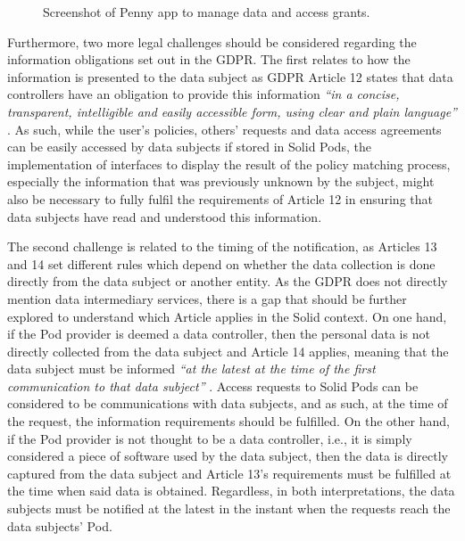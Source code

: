 \begin{figure}[htp]
    \centering
    \caption{Screenshot of Penny app to manage data and access grants.}
    \label{fig:penny}
\end{figure}

Furthermore, two more legal challenges should be considered regarding the information obligations set out in the GDPR.
The first relates to how the information is presented to the data subject as GDPR Article 12 states that data controllers have an obligation to provide this information \textit{``in a concise, transparent, intelligible and easily accessible form, using clear and plain language''} \citeyearpar{noauthor_regulation_2016}.
As such, while the user's policies, others' requests and data access agreements can be easily accessed by data subjects if stored in Solid Pods, the implementation of interfaces to display the result of the policy matching process, especially the information that was previously unknown by the subject, might also be necessary to fully fulfil the requirements of Article 12 in ensuring that data subjects have read and understood this information.

The second challenge is related to the timing of the notification, as Articles 13 and 14 set different rules which depend on whether the data collection is done directly from the data subject or another entity.
As the GDPR does not directly mention data intermediary services, there is a gap that should be further explored to understand which Article applies in the Solid context.
On one hand, if the Pod provider is deemed a data controller, then the personal data is not directly collected from the data subject \citep{pandit_making_2023} and Article 14 applies, meaning that the data subject must be informed \textit{``at the latest at the time of the first communication to that data subject''} \citeyearpar{noauthor_regulation_2016}.
Access requests to Solid Pods can be considered to be communications with data subjects, and as such, at the time of the request, the information requirements should be fulfilled.
On the other hand, if the Pod provider is not thought to be a data controller, i.e., it is simply considered a piece of software used by the data subject, then the data is directly captured from the data subject and Article 13's requirements must be fulfilled at the time when said data is obtained.
Regardless, in both interpretations, the data subjects must be notified at the latest in the instant when the requests reach the data subjects' Pod.

